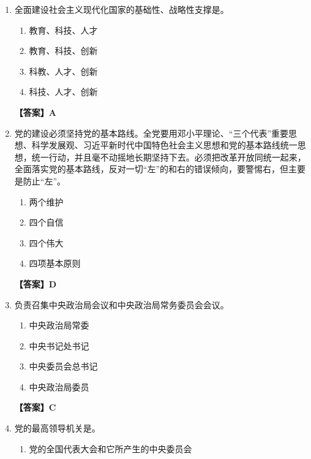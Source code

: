 \documentclass[UTF8,11pt,a4paper]{ctexart}
\begin{document}
\begin{enumerate}[label=\textbf{\arabic*.}, leftmargin=2.5em, itemsep=0.7em]
\begin{enumerate}[label=\Alph*., leftmargin=2em, itemsep=0.1em, topsep=0.15em]
\item 科技强军
\item 科技兴军
\item 科技为军
\end{enumerate}
\textbf{【答案】B}
\item 全面建设社会主义现代化国家的基础性、战略性支撑是\allowbreak\underline{\hspace{4em}}。
\begin{enumerate}[label=\Alph*., leftmargin=2em, itemsep=0.1em, topsep=0.15em]
\item 教育、科技、人才
\item 教育、科技、创新
\item 科教、人才、创新
\item 科技、人才、创新
\end{enumerate}
\textbf{【答案】A}
\item 党的建设必须坚持党的基本路线。全党要用邓小平理论、“三个代表”重要思想、科学发展观、习近平新时代中国特色社会主义思想和党的基本路线统一思想，统一行动，并且毫不动摇地长期坚持下去。必须把改革开放同\allowbreak\underline{\hspace{4em}}统一起来，全面落实党的基本路线，反对一切“左”的和右的错误倾向，要警惕右，但主要是防止“左”。
\begin{enumerate}[label=\Alph*., leftmargin=2em, itemsep=0.1em, topsep=0.15em]
\item 两个维护
\item 四个自信
\item 四个伟大
\item 四项基本原则
\end{enumerate}
\textbf{【答案】D}
\item \allowbreak\underline{\hspace{4em}}负责召集中央政治局会议和中央政治局常务委员会会议。
\begin{enumerate}[label=\Alph*., leftmargin=2em, itemsep=0.1em, topsep=0.15em]
\item 中央政治局常委
\item 中央书记处书记
\item 中央委员会总书记
\item 中央政治局委员
\end{enumerate}
\textbf{【答案】C}
\item 党的最高领导机关是\allowbreak\underline{\hspace{4em}}。
\begin{enumerate}[label=\Alph*., leftmargin=2em, itemsep=0.1em, topsep=0.15em]
\item 党的全国代表大会和它所产生的中央委员会

\end{enumerate}
\end{enumerate}
\end{document}
